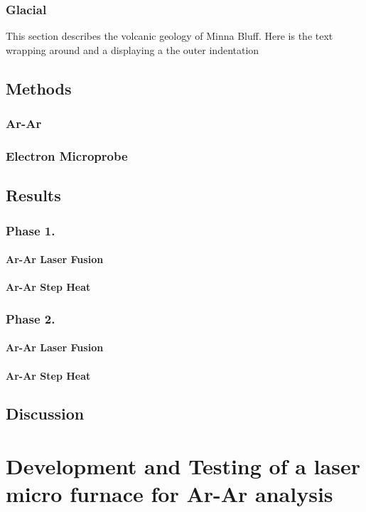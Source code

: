 \documentclass[12pt]{report}
\begin{document}
\subsection{Glacial}
This section describes the volcanic geology of Minna Bluff. Here is the text
wrapping around and a displaying a the outer indentation

\section{Methods}
\subsection{Ar-Ar}
\subsection{Electron Microprobe}
\section{Results}
\subsection{Phase 1.}
\subsubsection{Ar-Ar Laser Fusion}
\subsubsection{Ar-Ar Step Heat}
\subsection{Phase 2.}
\subsubsection{Ar-Ar Laser Fusion}
\subsubsection{Ar-Ar Step Heat}
\section{Discussion}
\chapter{Development and Testing of a laser micro furnace for Ar-Ar analysis}
\end{document}
